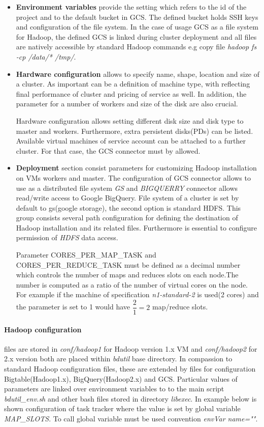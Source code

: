 \documentclass[a4paper,12pt,oneside]{report}
\begin{document}
\begin{itemize}
\item \textbf{Environment variables} provide the setting which refers to the id of the project and to 
the default bucket in GCS. The defined bucket holds SSH keys and configuration of the file system. In 
the case of usage GCS as a file system for Hadoop, the defined GCS is linked  during cluster deployment 
and all files are natively accessible by standard Hadoop commands e.g copy file \textit{hadoop fs -cp  /data/* /tmp/}.

\item \textbf{Hardware configuration}
allows to specify name, shape, location and size of a cluster. As important can be a definition of machine
 type, with reflecting final performance of cluster and pricing of service as well. In addition, the parameter 
 for a number of workers and size of the disk are also crucial.

Hardware configuration allows setting different disk size and  disk type to master and workers. Furthermore, 
extra persistent disks(PDs) can be listed. Available virtual machines of service account can be attached to a 
further cluster. For that case, the GCS connector must by allowed.

\item \textbf{Deployment} section consist parameters for customizing Hadoop installation on VMs workers 
and master. The configuration of GCS connector allows to use as a distributed file system \textit{GS} and 
\textit{BIGQUERRY} connector allows read/write access to Google BigQuery. File system of a cluster is set 
by default to gs(google storage), the second 
option is standard HDFS. This group consists several path configuration for defining the destination of 
Hadoop installation and its related files. Furthermore is essential to configure permission  of \textit{HDFS} data access.

Parameter CORES\_PER\_MAP\_TASK and CORES\_PER\_REDUCE\_TASK must be defined as a decimal number which 
controls the number of maps and reduces slots on each node.The number is computed as a ratio of the 
number of virtual cores on the node. For example if the machine of specification \textit{ n1-standard-2} 
is used(2 cores) and the parameter is set to 1 would have $\dfrac{2}{1} = 2$ map/reduce slots.
\end{itemize}


\paragraph{Hadoop configuration} files  are stored in \textit{conf/hadoop1} for Hadoop version 1.x VM and 
\textit{conf/hadoop2} for 2.x version both are placed within \textit{bdutil} base directory. In compassion 
to standard Hadoop configuration files, these are extended by files for configuration Bigtable(Hadoop1.x), 
BigQuery(Hadoop2.x) and GCS. Particular values of parameters are linked over environment variables to  to 
the main script \textit{bdutil\_env.sh} and other bash files stored in directory \textit{libexec}. In 
example below is shown configuration of task tracker where the value is set by global variable 
\textit{MAP\_SLOTS}. To call global variable must be used convention \textit{envVar name=""}.
\end{document}
